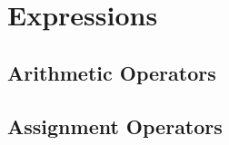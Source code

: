 \documentclass[../main.tex]{subfiles}
\begin{document}
\section{Expressions}

\subsection{Arithmetic Operators}
\subsection{Assignment Operators}
\end{document}
